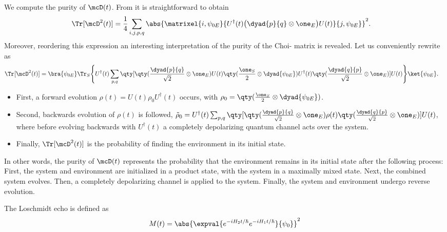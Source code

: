We compute the purity of $\mcD(t)$. From  
it is straightforward to obtain
\begin{align}\label{eq:choi:chaometer:purity:1}
\Tr[\mcD^2(t)]  &= 
\frac{1}{4}
\sum_{i,j,p,q}
\abs{\matrixel{i, \psi_{0E}}
{U^\dagger(t) \big(\dyad{p}{q} \otimes \one_E\big) U(t)}
{j, \psi_{0E}}
}^2.
\end{align}
Moreover, reordering this expression an interesting interpretation of the purity 
of the Choi-\jami{} matrix is revealed. Let us conveniently rewrite
 as
\begin{align}\label{eq:choi:chaometer:purity:2}
\Tr[\mcD^2(t)]  &= 
\bra{\psi_{0E}}
\Tr_S\Bigg\{
U^\dagger(t) 
\sum_{p, q} \qty[
\qty(\frac{\dyad{p}{q}}{\sqrt{2}} \otimes \one_E ) 
U(t)
\qty( \frac{\one_S}{2} \otimes \dyad{\psi_{0E}})
U^\dagger(t) 
\qty(\frac{\dyad{q}{p}}{\sqrt{2}} \otimes \one_E ) 
]
U(t)\Bigg\}
\ket{\psi_{0E}}.
\end{align}

\begin{itemize}
\item First, a forward evolution $\rho(t) = U(t) \rho_0 U^\dagger(t) $ occurs, 
with $\rho_0 = \qty( \frac{\one_S}{2} \otimes \dyad{\psi_{0E}})$.
\item Second, backwards evolution of $\rho(t)$ is followed, 
$\tilde \rho_0 = U^\dagger(t) 
\sum_{p, q} \qty[
\qty(\frac{\dyad{p}{q}}{\sqrt{2}} \otimes \one_E ) 
\rho(t)
\qty(\frac{\dyad{q}{p}}{\sqrt{2}} \otimes \one_E ) 
]
U(t)$, where before evolving backwards with $U^\dagger(t)$ a completely 
depolarizing quantum channel acts over the system.
\item Finally, $\Tr[\mcD^2(t)]$ is the probability of finding the environment 
in its initial state.
\end{itemize}

In other words, the purity of $\mcD(t)$ represents the probability that the 
environment remains in its initial state after the following process: First, the system
and environment are initialized in a product state, with the system in a maximally
mixed state. Next, the combined system evolves. Then, a completely depolarizing
channel is applied to the system. Finally, the system and environment undergo 
reverse evolution.

The Loschmidt echo is defined as
\begin{equation}\label{eq:loschmidt:echo}
M(t) = 
\abs{\expval{e^{-i H_2 t/\hbar}e^{-i H_1 t/\hbar}}{\psi_0}}^2
\end{equation}

